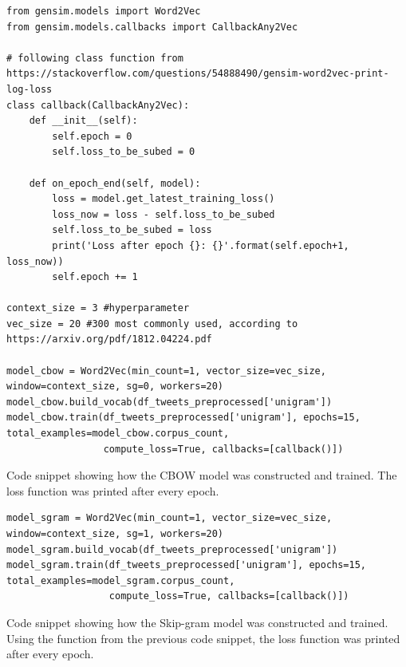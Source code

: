 \begin{listing*}
\begin{verbatim}
from gensim.models import Word2Vec
from gensim.models.callbacks import CallbackAny2Vec

# following class function from https://stackoverflow.com/questions/54888490/gensim-word2vec-print-log-loss
class callback(CallbackAny2Vec):
    def __init__(self):
        self.epoch = 0
        self.loss_to_be_subed = 0

    def on_epoch_end(self, model):
        loss = model.get_latest_training_loss()
        loss_now = loss - self.loss_to_be_subed
        self.loss_to_be_subed = loss
        print('Loss after epoch {}: {}'.format(self.epoch+1, loss_now))
        self.epoch += 1
        
context_size = 3 #hyperparameter
vec_size = 20 #300 most commonly used, according to https://arxiv.org/pdf/1812.04224.pdf

model_cbow = Word2Vec(min_count=1, vector_size=vec_size, window=context_size, sg=0, workers=20)
model_cbow.build_vocab(df_tweets_preprocessed['unigram'])
model_cbow.train(df_tweets_preprocessed['unigram'], epochs=15, total_examples=model_cbow.corpus_count,
                 compute_loss=True, callbacks=[callback()])
\end{verbatim}
\caption{Code snippet showing how the CBOW model was constructed and trained. The loss function was printed after every epoch.}
\label{listing:p2-cbow}
\end{listing*}

\begin{listing*}
\begin{verbatim}
model_sgram = Word2Vec(min_count=1, vector_size=vec_size, window=context_size, sg=1, workers=20)
model_sgram.build_vocab(df_tweets_preprocessed['unigram'])
model_sgram.train(df_tweets_preprocessed['unigram'], epochs=15, total_examples=model_sgram.corpus_count,
                  compute_loss=True, callbacks=[callback()])
\end{verbatim}
\caption{Code snippet showing how the Skip-gram model was constructed and trained. Using the function from the previous code snippet, the loss function was printed after every epoch.}
\label{listing:p2-sgram}
\end{listing*}


